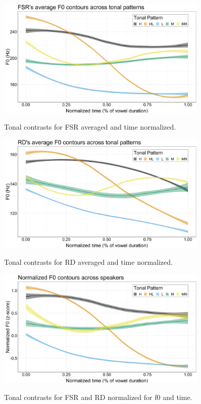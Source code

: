 \documentclass[12pt, letterpaper]{article}
\begin{document}
\begin{figure}[!ht]
	\centering
	\includegraphics[width=0.9\textwidth]{../FSRTonePlot.png}
	\label{fig:LAMNetwork}
	\caption{Tonal contrasts for FSR averaged and time normalized.}
\end{figure}

\begin{figure}[!ht]
	\centering
	\includegraphics[width=0.9\textwidth]{../RDTonePlot.png}
	\label{fig:LAMNetwork}
	\caption{Tonal contrasts for RD averaged and time normalized.}
\end{figure}

\begin{figure}[!ht]
	\centering
	\includegraphics[width=0.9\textwidth]{../JoinTonePlot.png}
	\label{fig:LAMNetwork}
	\caption{Tonal contrasts for FSR and RD normalized for f0 and time.}
\end{figure}
\end{document}
